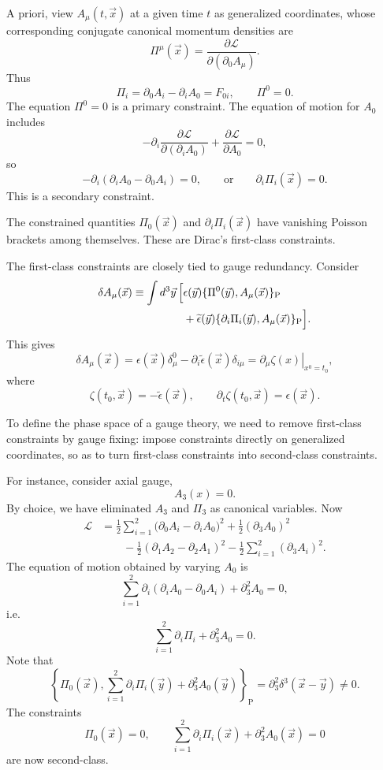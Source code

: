 A priori, view \(A_\mu(t,\vec x)\) at a given time \(t\) as generalized
coordinates, whose corresponding conjugate canonical momentum densities are
\[
  \Pi^\mu(\vec x)
  =
  \frac{\partial\mathcal L}{\partial(\partial_0A_\mu)}.
\]
Thus
\[
  \Pi_i=\partial_0A_i-\partial_iA_0=F_{0i},
  \qquad
  \Pi^0=0.
\]
The equation \(\Pi^0=0\) is a primary constraint.  The equation of motion
for \(A_0\) includes
\[
  -\partial_i
  \frac{\partial\mathcal L}{\partial(\partial_iA_0)}
  +\frac{\partial\mathcal L}{\partial A_0}=0,
\]
so
\[
  -\partial_i(\partial_iA_0-\partial_0A_i)=0,
  \qquad\text{or}\qquad
  \partial_i\Pi_i(\vec x)=0.
\]
This is a secondary constraint.

The constrained quantities \(\Pi_0(\vec x)\) and
\(\partial_i\Pi_i(\vec x)\) have vanishing Poisson brackets among
themselves.  These are Dirac's first-class constraints.

The first-class constraints are closely tied to gauge redundancy.  Consider
\[
\begin{aligned}
  \delta A_\mu(\vec x)
  \equiv
  \int d^3\vec y\,
  \Bigl[
    &\epsilon(\vec y)
      \{\Pi^0(\vec y),A_\mu(\vec x)\}_{\mathrm P}
\\
    &+\widetilde\epsilon(\vec y)
      \{\partial_i\Pi_i(\vec y),A_\mu(\vec x)\}_{\mathrm P}
  \Bigr].
\end{aligned}
\]
This gives
\[
  \delta A_\mu(\vec x)
  =
  \epsilon(\vec x)\delta_\mu^0
  -\partial_i\widetilde\epsilon(\vec x)\delta_{i\mu}
  =
  \left.\partial_\mu\zeta(x)\right|_{x^0=t_0},
\]
where
\[
  \zeta(t_0,\vec x)=-\widetilde\epsilon(\vec x),
  \qquad
  \partial_t\zeta(t_0,\vec x)=\epsilon(\vec x).
\]

To define the phase space of a gauge theory, we need to remove first-class
constraints by gauge fixing: impose constraints directly on generalized
coordinates, so as to turn first-class constraints into second-class
constraints.

For instance, consider axial gauge,
\[
  A_3(x)=0.
\]
By choice, we have eliminated \(A_3\) and \(\Pi_3\) as canonical variables.
Now
\[
\begin{aligned}
  \mathcal L
  &=
  \frac12\sum_{i=1}^2
  \bigl(\partial_0A_i-\partial_iA_0\bigr)^2
  +\frac12(\partial_3A_0)^2
\\
  &\hspace{2em}
  -\frac12(\partial_1A_2-\partial_2A_1)^2
  -\frac12\sum_{i=1}^2(\partial_3A_i)^2.
\end{aligned}
\]
The equation of motion obtained by varying \(A_0\) is
\[
  \sum_{i=1}^2
  \partial_i(\partial_iA_0-\partial_0A_i)
  +\partial_3^2A_0=0,
\]
i.e.
\[
  \sum_{i=1}^2\partial_i\Pi_i+\partial_3^2A_0=0.
\]
Note that
\[
  \left\{
    \Pi_0(\vec x),
    \sum_{i=1}^2\partial_i\Pi_i(\vec y)+\partial_3^2A_0(\vec y)
  \right\}_{\mathrm P}
  =
  \partial_3^2\delta^3(\vec x-\vec y)
  \neq0.
\]
The constraints
\[
  \Pi_0(\vec x)=0,
  \qquad
  \sum_{i=1}^2\partial_i\Pi_i(\vec x)+\partial_3^2A_0(\vec x)=0
\]
are now second-class.

